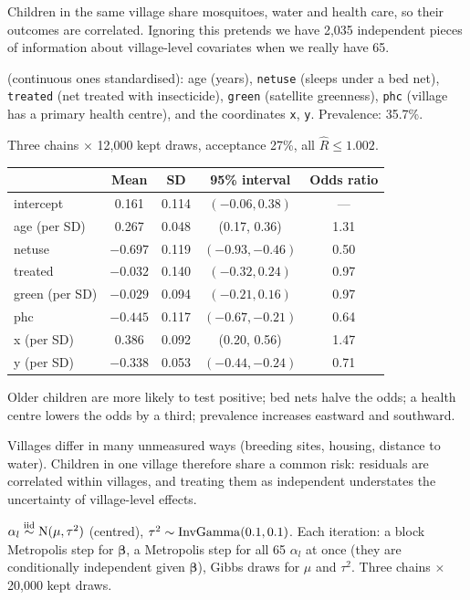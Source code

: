 \documentclass[11pt]{article}
\begin{document}
\begin{keyidea}
Children in the same village share mosquitoes, water and health care, so their outcomes are correlated. Ignoring this pretends we have 2{,}035 independent pieces of information about village-level covariates when we really have 65.
\end{keyidea}

\solution
{} (continuous ones standardised): age (years), \texttt{netuse} (sleeps under a bed net), \texttt{treated} (net treated with insecticide), \texttt{green} (satellite greenness), \texttt{phc} (village has a primary health centre), and the coordinates \texttt{x}, \texttt{y}. Prevalence: 35.7\%.

 Three chains $\times$ 12{,}000 kept draws, acceptance 27\%, all $\hat R\le1.002$.
\begin{center}
\small
\begin{tabular}{lccc|c}\toprule
 & Mean & SD & 95\% interval & Odds ratio\\\midrule
intercept & 0.161 & 0.114 & $(-0.06, 0.38)$ & ---\\
age (per SD) & 0.267 & 0.048 & (0.17, 0.36) & 1.31\\
netuse & $-0.697$ & 0.119 & $(-0.93,-0.46)$ & 0.50\\
treated & $-0.032$ & 0.140 & $(-0.32, 0.24)$ & 0.97\\
green (per SD) & $-0.029$ & 0.094 & $(-0.21, 0.16)$ & 0.97\\
phc & $-0.445$ & 0.117 & $(-0.67,-0.21)$ & 0.64\\
x (per SD) & 0.386 & 0.092 & (0.20, 0.56) & 1.47\\
y (per SD) & $-0.338$ & 0.053 & $(-0.44,-0.24)$ & 0.71\\\bottomrule
\end{tabular}
\end{center}
Older children are more likely to test positive; bed nets halve the odds; a health centre lowers the odds by a third; prevalence increases eastward and southward.

 Villages differ in many unmeasured ways (breeding sites, housing, distance to water). Children in one village therefore share a common risk: residuals are correlated within villages, and treating them as independent understates the uncertainty of village-level effects.

 $\alpha_l\stackrel{\text{iid}}{\sim}\mathrm{N}(\mu,\tau^2)$ (centred), $\tau^2\sim\mathrm{InvGamma}(0.1,0.1)$. Each iteration: a block Metropolis step for $\bm\beta$, a Metropolis step for all 65 $\alpha_l$ at once (they are conditionally independent given $\bm\beta$), Gibbs draws for $\mu$ and $\tau^2$. Three chains $\times$ 20{,}000 kept draws.
\end{document}
